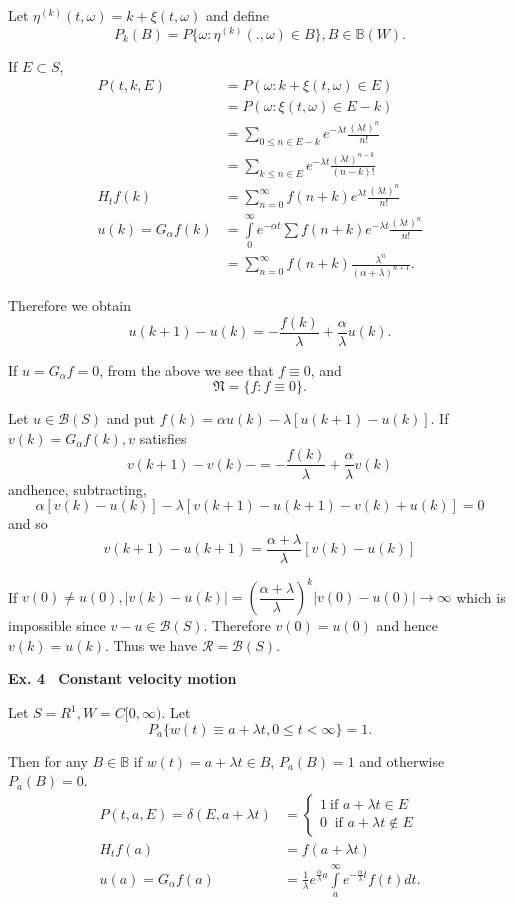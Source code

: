 Let $\eta^{(k)}(t, \omega) = k+ \xi (t, \omega)$ and define
$$
P_k (B )= P\{\omega : \eta^{(k)} (.,\omega)\in B\} , B \in
\mathbb{B}(W). 
$$

If $E \subset S$, 
\begin{align*}
  P(t, k, E) & = P(\omega : k + \xi (t, \omega) \in E)\\
  & = P(\omega: \xi (t, \omega) \in E - k) \\
  & = \sum_ { 0 \leq n \in E -k} e^{ - \lambda t} \frac{(\lambda t)^n}{n!}\\
  & = \sum_{k \leq n \in E } e^{ - \lambda t} \frac{(\lambda t)^{n -k}}{(n - k)!}\\
  H_t f(k)  & =  \sum^{\infty}_{ n = 0} f (n + k)e ^{ \lambda t}
  \frac{(\lambda t)^n}{n!}\\ 
  u(k) = G_\alpha f (k) & = \int\limits^\infty_0 e^{-\alpha t}
  \sum f (n + k) e^{-\lambda t} \frac{(\lambda t)^n}{n!}\\ 
  & = \sum^\infty_{n = 0}  f (n + k) \frac{\lambda^n}{(\alpha +
    \lambda)^{ n + 1}}. 
\end{align*}\pageoriginale

Therefore we obtain 
$$
u (k + 1) - u(k) = - \frac{f(k)}{\lambda}+ \frac{\alpha}{\lambda} u(k). 
$$

If $u = G_\alpha  f = 0$, from the above we see that $f \equiv 0$, and 
$$
\mathfrak{N} = \{ f : f  \equiv 0\}. 
$$

Let $u \in \mathscr{B}(S)$ and put $f (k) = \alpha u (k) - \lambda [ u
  (k + 1) - u (k)]$. If $v(k) = G_\alpha f (k), v $ satisfies  
$$
v(k +1) - v(k) -=- \frac{f(k)}{\lambda} + \frac{\alpha }{\lambda}v(k)
$$
and\pageoriginale hence, subtracting,  
$$
\alpha [ v (k) - u (k)] - \lambda [ v (k +1) - u (k+1) - v (k) + u(k)]
  = 0
$$
and so
$$ 
  v (k +1) - u (k +1) = \frac{\alpha + \lambda}{\lambda} [ v (k) - u
    (k )] 
$$

If $v(0) \neq u(0) , | v(k) - u(k) | = (\dfrac{\alpha +
  \lambda}{\lambda})^k  | v (0) - u(0) | \to \infty $ which is
impossible since $v - u \in \mathscr{B}(S)$. Therefore $v(0) = u (0)$
and hence $v(k) = u(k)$. Thus we have $\mathscr{R} = \mathscr{B}(S)$.  

\medskip
\noindent
{\bf Ex. 4~ Constant velocity motion}
\smallskip

Let $S = R^1 , W = C [ 0 , \infty)$. Let 
$$
P_a \{ w(t) \equiv a + \lambda t, 0 \leq t < \infty \} = 1.
$$

Then for any $B \in \mathbb{B}$ if $w(t) = a+ \lambda t \in B$, $P_a (B) =
1$ and otherwise $P_a (B) = 0$.  
\begin{align*}
  P (t, a, E) = \delta (E, a + \lambda t) & = \begin{cases}  1\ \text{
      if } a + \lambda t \in E \\0\ \text{ if }a + \lambda t \notin
    E \end{cases}\\ 
  H_t f(a) & = f (a + \lambda t) \\
  u(a) = G_\alpha f(a) & = \frac{1}{\lambda} e^{
    \frac{\alpha}{\lambda}a} \int\limits^ \infty _a e^{ - \frac{\alpha
    }{\lambda}t} f (t)dt.  
\end{align*}

